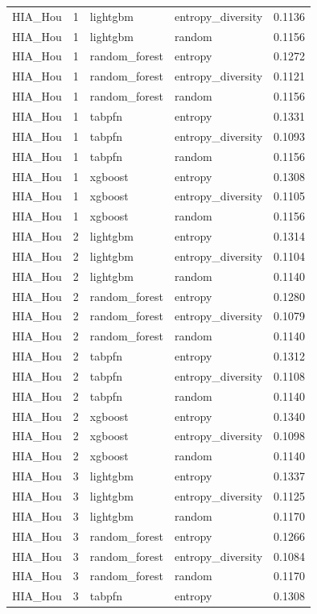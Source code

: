 \begin{tabular}{lrllr}
HIA_Hou & 1 & lightgbm & entropy_diversity & 0.1136 \\
HIA_Hou & 1 & lightgbm & random & 0.1156 \\
HIA_Hou & 1 & random_forest & entropy & 0.1272 \\
HIA_Hou & 1 & random_forest & entropy_diversity & 0.1121 \\
HIA_Hou & 1 & random_forest & random & 0.1156 \\
HIA_Hou & 1 & tabpfn & entropy & 0.1331 \\
HIA_Hou & 1 & tabpfn & entropy_diversity & 0.1093 \\
HIA_Hou & 1 & tabpfn & random & 0.1156 \\
HIA_Hou & 1 & xgboost & entropy & 0.1308 \\
HIA_Hou & 1 & xgboost & entropy_diversity & 0.1105 \\
HIA_Hou & 1 & xgboost & random & 0.1156 \\
HIA_Hou & 2 & lightgbm & entropy & 0.1314 \\
HIA_Hou & 2 & lightgbm & entropy_diversity & 0.1104 \\
HIA_Hou & 2 & lightgbm & random & 0.1140 \\
HIA_Hou & 2 & random_forest & entropy & 0.1280 \\
HIA_Hou & 2 & random_forest & entropy_diversity & 0.1079 \\
HIA_Hou & 2 & random_forest & random & 0.1140 \\
HIA_Hou & 2 & tabpfn & entropy & 0.1312 \\
HIA_Hou & 2 & tabpfn & entropy_diversity & 0.1108 \\
HIA_Hou & 2 & tabpfn & random & 0.1140 \\
HIA_Hou & 2 & xgboost & entropy & 0.1340 \\
HIA_Hou & 2 & xgboost & entropy_diversity & 0.1098 \\
HIA_Hou & 2 & xgboost & random & 0.1140 \\
HIA_Hou & 3 & lightgbm & entropy & 0.1337 \\
HIA_Hou & 3 & lightgbm & entropy_diversity & 0.1125 \\
HIA_Hou & 3 & lightgbm & random & 0.1170 \\
HIA_Hou & 3 & random_forest & entropy & 0.1266 \\
HIA_Hou & 3 & random_forest & entropy_diversity & 0.1084 \\
HIA_Hou & 3 & random_forest & random & 0.1170 \\
HIA_Hou & 3 & tabpfn & entropy & 0.1308 \\

\end{tabular}
